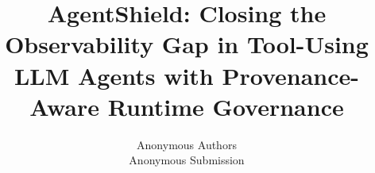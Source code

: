 \documentclass[letterpaper,twocolumn,10pt]{article}
\begin{document}

\date{}

\title{\Large \bf AgentShield: Closing the Observability Gap in Tool-Using
LLM Agents with Provenance-Aware Runtime Governance}

\author{
{\rm Anonymous Authors}\\
Anonymous Submission
}

\maketitle

\end{document}
